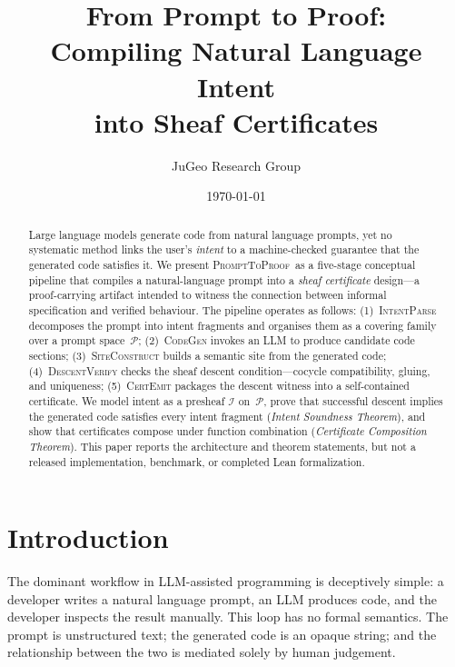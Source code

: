 \documentclass[11pt]{article}
\title{\textbf{From Prompt to Proof:\\
Compiling Natural Language Intent\\
into Sheaf Certificates}}
\author{%
  JuGeo Research Group
}
\date{\today}
\newcommand{\PromptToProof}{\textsc{PromptToProof}}
\newcommand{\IntentSheaf}{\mathcal{I}}
\newcommand{\PromptSpace}{\mathcal{P}}
\newcommand{\IntentParse}{\textsc{IntentParse}}
\newcommand{\CodeGen}{\textsc{CodeGen}}
\newcommand{\SiteConstruct}{\textsc{SiteConstruct}}
\newcommand{\DescentVerify}{\textsc{DescentVerify}}
\newcommand{\CertEmit}{\textsc{CertEmit}}
\begin{document}
\maketitle

\begin{abstract}

Large language models generate code from natural language prompts, yet
no systematic method links the user's \emph{intent} to a
machine-checked guarantee that the generated code satisfies it.  We
present \PromptToProof\ as a five-stage conceptual pipeline that compiles a
natural-language prompt into a \emph{sheaf certificate} design---a
proof-carrying \Python{} artifact intended to witness the connection between
informal specification and verified behaviour.  The pipeline
operates as follows: (1)~\IntentParse{} decomposes the prompt into
intent fragments and organises them as a covering family over a
prompt space~$\PromptSpace$; (2)~\CodeGen{} invokes an LLM to
produce candidate code sections; (3)~\SiteConstruct{} builds a
\JuGeo{} semantic site from the generated code; (4)~\DescentVerify{}
checks the sheaf descent condition---cocycle compatibility, gluing,
and uniqueness; (5)~\CertEmit{} packages the descent witness into
a self-contained certificate.  We model intent as a presheaf
$\IntentSheaf$ on~$\PromptSpace$, prove that successful descent
implies the generated code satisfies every intent fragment
(\emph{Intent Soundness Theorem}), and show that certificates compose
under function combination (\emph{Certificate Composition Theorem}).
This paper reports the architecture and theorem statements, but not a released
implementation, benchmark, or completed Lean formalization.

\end{abstract}

\newpage

\section{Introduction}\label{sec:intro}

The dominant workflow in LLM-assisted programming is deceptively
simple: a developer writes a natural language prompt, an LLM produces
code, and the developer inspects the result manually.  This loop has
no formal semantics.  The prompt is unstructured text; the generated
code is an opaque string; and the relationship between the two is
mediated solely by human judgement.
\end{document}
